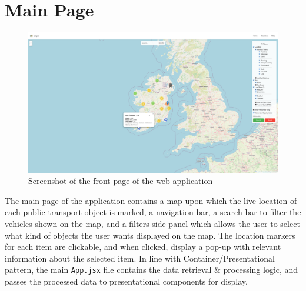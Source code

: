\documentclass[a4paper,11pt]{report}
\begin{document}
\section{Main Page}
\begin{figure}[H]
    \centering
    \includegraphics[width=\textwidth]{./images/mainpage.png}
    \caption{Screenshot of the front page of the web application}
\end{figure}

The main page of the application contains a map upon which the live location of each public transport object is marked, a navigation bar, a search bar to filter the vehicles shown on the map, and a filters side-panel which allows the user to select what kind of objects the user wants displayed on the map.
The location markers for each item are clickable, and when clicked, display a pop-up with relevant information about the selected item.
In line with Container/Presentational pattern, the main \verb|App.jsx| file contains the data retrieval \& processing logic, and passes the processed data to presentational components for display. 
\end{document}
